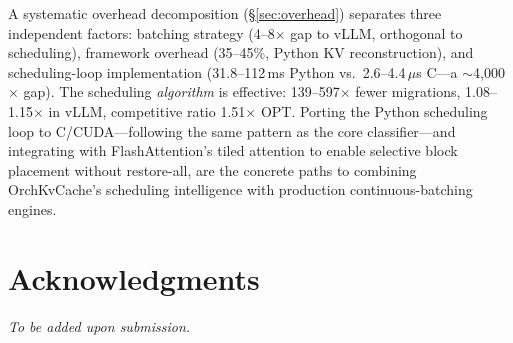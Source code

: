 \documentclass[conference]{IEEEtran}
\begin{document}
A systematic overhead decomposition (\S\ref{sec:overhead}) separates three independent factors: batching strategy (4--8$\times$ gap to vLLM, orthogonal to scheduling), framework overhead (35--45\%, Python KV reconstruction), and scheduling-loop implementation (31.8--112\,ms Python vs.\ 2.6--4.4\,$\mu$s C---a ${\sim}$4{,}000$\times$ gap). The scheduling \emph{algorithm} is effective: 139--597$\times$ fewer migrations, 1.08--1.15$\times$ in vLLM, competitive ratio 1.51$\times$ OPT. Porting the Python scheduling loop to C/CUDA---following the same pattern as the core classifier---and integrating with FlashAttention's tiled attention to enable selective block placement without restore-all, are the concrete paths to combining OrchKvCache's scheduling intelligence with production continuous-batching engines.

\section*{Acknowledgments}
\textit{To be added upon submission.}
\end{document}
